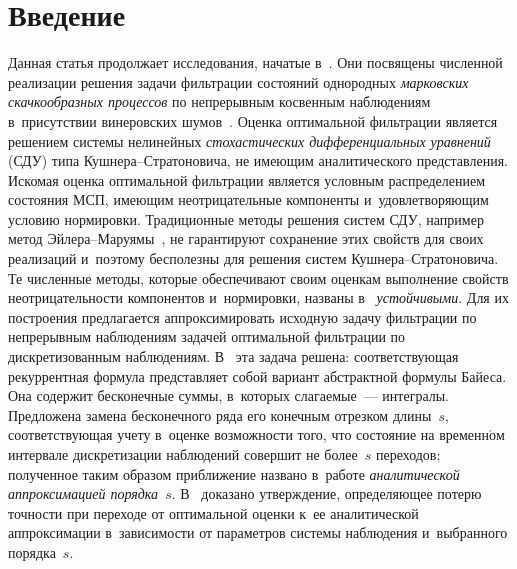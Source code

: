 
  
\vspace*{-3pt}



\thispagestyle{headings}

\begin{multicols}{2}

\label{st\stat}



 \section{Введение}
 
 Данная статья продолжает исследования, начатые в~\cite{B_18_IA, B_20_1_IA}. 
 Они посвящены численной реализации решения задачи фильтрации состояний 
 однородных \textit{марковских скачкообразных процессов} по непрерывным 
  косвенным наблюдениям в~присутствии винеровских шумов~\cite{Wonham_64,  B_18}. 
   Оценка оптимальной фильтрации является решением сис\-те\-мы нелинейных 
   \textit{стохастических дифференциальных уравнений} (СДУ) типа
 Куш\-не\-ра--Стра\-то\-но\-ви\-ча, не имеющим аналитического представления. 
 Искомая оценка оптимальной фильтрации является условным распределением 
 состояния МСП, имеющим неотрицательные компоненты и~удовлетворяющим 
 условию нормировки. Традиционные методы решения систем СДУ, например метод
 Эй\-ле\-ра--Ма\-ру\-ямы~\cite{KP_92}, не гарантируют сохранение этих 
 свойств для своих реализаций и~поэтому бесполезны для решения систем 
 Куш\-не\-ра--Стра\-то\-но\-ви\-ча.  Те численные методы, которые 
 обеспечивают своим оценкам выполнение свойств не\-от\-ри\-ца\-тель\-ности 
 компонентов и~нормировки, названы в~\cite{B_18_IA, B_20_1_IA}  
 \textit{устойчивыми}. Для их построения предлагается аппроксимировать 
 исходную задачу фильтрации по непрерывным наблюдениям задачей оптимальной 
 фильтрации по дискретизованным наблюдениям. В~\cite{B_18_IA} эта задача решена:
  соответствующая рекуррентная формула представляет собой вариант 
  абстрактной формулы Байеса. Она содержит бесконечные суммы, в~которых 
  слагаемые~--- интегралы. Предложена замена бесконечного ряда его 
  конечным отрезком длины~$s$, соответствующая учету в~оценке возможности 
  того, что состояние на временн$\acute{\mbox{о}}$м 
  интервале дискретизации наблюдений совершит не более~$s$ переходов; 
  полученное таким образом приближение названо в~работе 
  \textit{аналитической аппроксимацией порядка~$s$}. 
  В~\cite{B_18_IA} доказано утверждение, определяющее потерю точности 
  при переходе от оптимальной оценки к~ее аналитической 
  аппроксимации в~зависимости от параметров системы наблюдения и~выбранного 
  порядка~$s$.


\end{multicols}
